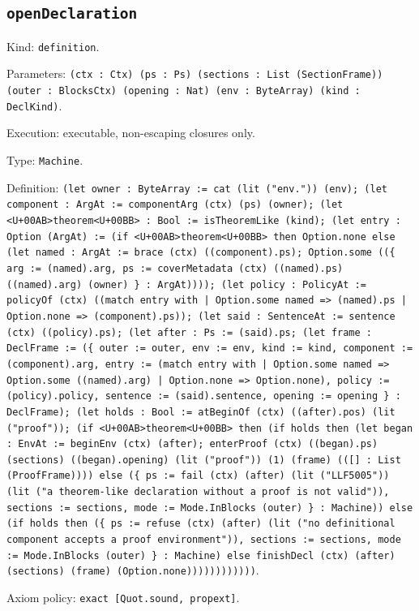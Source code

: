 \documentclass[11pt]{article}
\begin{document}
\subsection*{\texttt{openDeclaration}}
\noindent Kind: \texttt{definition}.\par
\noindent Parameters: \texttt{(ctx : Ctx) (ps : Ps) (sections : List (SectionFrame)) (outer : BlocksCtx) (opening : Nat) (env : ByteArray) (kind : DeclKind)}.\par
\noindent Execution: executable, non-escaping closures only.\par
\noindent Type: \texttt{Machine}.\par
\noindent Definition: \texttt{(let owner : ByteArray := cat (lit ("env.")) (env); (let component : ArgAt := componentArg (ctx) (ps) (owner); (let <U+00AB>theorem<U+00BB> : Bool := isTheoremLike (kind); (let entry : Option (ArgAt) := (if <U+00AB>theorem<U+00BB> then Option.none else (let named : ArgAt := brace (ctx) ((component).ps); Option.some ((\{ arg := (named).arg, ps := coverMetadata (ctx) ((named).ps) ((named).arg) (owner) \} : ArgAt)))); (let policy : PolicyAt := policyOf (ctx) ((match entry with | Option.some named => (named).ps | Option.none => (component).ps)); (let said : SentenceAt := sentence (ctx) ((policy).ps); (let after : Ps := (said).ps; (let frame : DeclFrame := (\{ outer := outer, env := env, kind := kind, component := (component).arg, entry := (match entry with | Option.some named => Option.some ((named).arg) | Option.none => Option.none), policy := (policy).policy, sentence := (said).sentence, opening := opening \} : DeclFrame); (let holds : Bool := atBeginOf (ctx) ((after).pos) (lit ("proof")); (if <U+00AB>theorem<U+00BB> then (if holds then (let began : EnvAt := beginEnv (ctx) (after); enterProof (ctx) ((began).ps) (sections) ((began).opening) (lit ("proof")) (1) (frame) (([] : List (ProofFrame)))) else (\{ ps := fail (ctx) (after) (lit ("LLF5005")) (lit ("a theorem-like declaration without a proof is not valid")), sections := sections, mode := Mode.InBlocks (outer) \} : Machine)) else (if holds then (\{ ps := refuse (ctx) (after) (lit ("no definitional component accepts a proof environment")), sections := sections, mode := Mode.InBlocks (outer) \} : Machine) else finishDecl (ctx) (after) (sections) (frame) (Option.none))))))))))))}.\par
\noindent Axiom policy: \texttt{exact [Quot.sound, propext]}.\par
\end{document}
